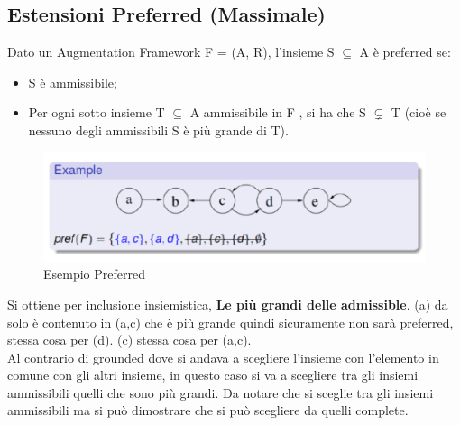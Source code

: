 \subsection{Estensioni Preferred (Massimale)}
Dato un Augmentation Framework F = (A, R), l'insieme S $\subseteq$ A è preferred
se:
\begin{itemize}
    \item S è ammissibile;
    \item Per ogni sotto insieme T $\subseteq$ A ammissibile in F , si ha che S
          $\subsetneq$ T (cioè se nessuno degli ammissibili S è più grande di T).
\end{itemize}
\begin{figure}[htp]
    \centering
    \includegraphics[width=12cm, keepaspectratio]{img/Cap6/prefered.png}
    \caption{Esempio Preferred}
\end{figure}
Si ottiene per inclusione insiemistica, \textbf{Le più grandi delle admissible}.
(a) da solo è contenuto in (a,c) che è più grande quindi sicuramente non sarà
preferred, stessa cosa per (d). (c) stessa cosa per (a,c). \\Al contrario di
grounded dove si andava a scegliere l'insieme con l'elemento in comune con gli
altri insieme, in questo caso si va a scegliere tra gli insiemi ammissibili
quelli che sono più grandi. Da notare che si sceglie tra gli insiemi ammissibili
ma si può dimostrare che si può scegliere da quelli complete.

